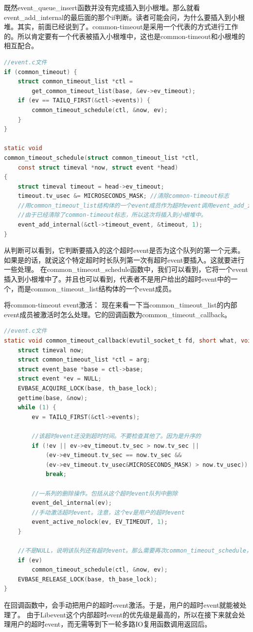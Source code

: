 \documentclass[11pt,a4paper]{article}
\begin{document}
既然event\_queue\_insert函数并没有完成插入到小根堆。那么就看event\_add\_internal的最后面的那个if判断。读者可能会问，为什么要插入到小根堆。其实，前面已经说到了。common-timeout是采用一个代表的方式进行工作的。所以肯定要有一个代表被插入小根堆中，这也是common-timeout和小根堆的相互配合。

\begin{lstlisting}[language=C]
//event.c文件
if (common_timeout) {
	struct common_timeout_list *ctl =
		get_common_timeout_list(base, &ev->ev_timeout);
	if (ev == TAILQ_FIRST(&ctl->events)) {
		common_timeout_schedule(ctl, &now, ev);
	}
}

static void
common_timeout_schedule(struct common_timeout_list *ctl,
    const struct timeval *now, struct event *head)
{
	struct timeval timeout = head->ev_timeout;
	timeout.tv_usec &= MICROSECONDS_MASK; //清除common-timeout标志
	//用common_timeout_list结构体的一个event成员作为超时event调用event_add_internal
	//由于已经清除了common-timeout标志，所以这次将插入到小根堆中。
	event_add_internal(&ctl->timeout_event, &timeout, 1);
}
\end{lstlisting}
从判断可以看到，它判断要插入的这个超时event是否为这个队列的第一个元素。如果是的话，就说这个特定超时时长队列第一次有超时event要插入。这就要进行一些处理。
在common\_timeout\_schedule函数中，我们可以看到，它将一个event插入到小根堆中了。并且也可以看到，代表者不是用户给出的超时event中的一个，而是common\_timeout\_list结构体的一个event成员。
        
将common-timeout event激活：
现在来看一下当common\_timeout\_list的内部event成员被激活时怎么处理。它的回调函数为common\_timeout\_callback。
\begin{lstlisting}[language=C]
//event.c文件
static void common_timeout_callback(evutil_socket_t fd, short what, void *arg) {
	struct timeval now;
	struct common_timeout_list *ctl = arg;
	struct event_base *base = ctl->base;
	struct event *ev = NULL;
	EVBASE_ACQUIRE_LOCK(base, th_base_lock);
	gettime(base, &now);
	while (1) {
		ev = TAILQ_FIRST(&ctl->events);

		//该超时event还没到超时时间。不要检查其他了。因为是升序的
		if (!ev || ev->ev_timeout.tv_sec > now.tv_sec ||
		    (ev->ev_timeout.tv_sec == now.tv_sec &&
			(ev->ev_timeout.tv_usec&MICROSECONDS_MASK) > now.tv_usec))
			break;

		//一系列的删除操作。包括从这个超时event队列中删除
		event_del_internal(ev);
		//手动激活超时event。注意，这个ev是用户的超时event
		event_active_nolock(ev, EV_TIMEOUT, 1);
	}

	//不是NULL，说明该队列还有超时event。那么需要再次common_timeout_schedule，进行监听
	if (ev)
		common_timeout_schedule(ctl, &now, ev);
	EVBASE_RELEASE_LOCK(base, th_base_lock);
}
\end{lstlisting}
在回调函数中，会手动把用户的超时event激活。于是，用户的超时event就能被处理了。
由于Libevent这个内部超时event的优先级是最高的，所以在接下来就会处理用户的超时event，而无需等到下一轮多路IO复用函数调用返回后。
\end{document}
